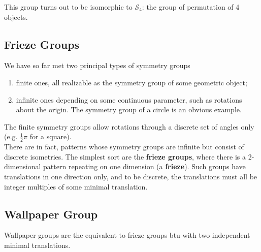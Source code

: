 This group turns out to be isomorphic to \(\mathcal{S}_4\): the group of permutation of 4 objects.


\subsection{Frieze Groups}

We have so far met two principal types of symmetry groups
\begin{enumerate}[label=\alph*)]
    \item finite ones, all realizable as the symmetry group of some geometric object;
    \item infinite ones depending on some continuous parameter, such as rotations about the origin. The symmetry group of a circle is an obvious example.
\end{enumerate}

The finite symmetry groups allow rotations through a discrete set of angles only (e.g. \(\frac{1}{2}\pi\) for a square). \\

There are in fact, patterns whose symmetry groups are infinite but consist of discrete isometries. The simplest sort are the \textbf{frieze groups}, where there is a 2-dimensional pattern repeating on one dimension (a \textbf{frieze}). Such groups have translations in one direction only, and to be discrete, the translations must all be integer multiples of some minimal translation.

\subsection{Wallpaper Group}

Wallpaper groups are the equivalent to frieze groups btu with two independent minimal translations.


